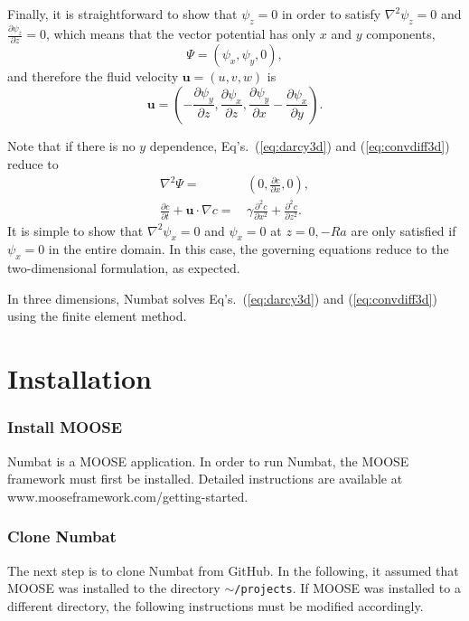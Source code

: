 \documentclass[11pt, a4paper]{csiroreport2012}
\begin{document}
Finally, it is straightforward to show that $\psi_z = 0$ in order to satisfy $\nabla^2 \psi_z = 0$ and $\frac{\partial \psi_z}{\partial z} = 0$, which means that the vector potential has only $x$ and $y$ components, 
\begin{equation}
\Psi = (\psi_x, \psi_y, 0),
\end{equation}
and therefore the fluid velocity $\mathbf{u} = (u, v, w)$ is
\begin{equation}
\mathbf{u} = \left( -\frac{\partial \psi_y}{\partial z}, \frac{\partial \psi_x}{\partial z}, \frac{\partial \psi_y}{\partial x} - \frac{\partial \psi_x}{\partial y} \right).
\end{equation}

Note that if there is no $y$ dependence, Eq's.~(\ref{eq:darcy3d}) and (\ref{eq:convdiff3d}) reduce to 
\begin{align}
\nabla^2 \Psi = \, & \left(0, \frac{\partial c}{\partial x}, 0 \right), \\
\frac{\partial c}{\partial t} + \mathbf{u} \cdot \nabla c = \, & \gamma \frac{\partial^2 c}{\partial x^2}  + \frac{\partial^2 c}{\partial z^2}.
\end{align}
It is simple to show that $\nabla^2 \psi_x = 0$ and $\psi_x = 0$ at $z = 0, -Ra$ are only satisfied if $\psi_x = 0$ in the entire domain. In this case, the governing equations reduce to the two-dimensional formulation, as expected.

In three dimensions, Numbat solves Eq's.~(\ref{eq:darcy3d}) and (\ref{eq:convdiff3d}) using the finite element method.

\section{Installation}



\subsubsection*{Install MOOSE}
 Numbat is  a MOOSE application. In order to run Numbat, the MOOSE framework must first be installed. Detailed instructions are available at www.mooseframework.com/getting-started.
 
 \subsubsection*{Clone Numbat}
 
 The next step is to clone Numbat from GitHub. In the following, it assumed that MOOSE was installed to the directory \texttt{$\sim$/projects}. If MOOSE was installed to a different directory, the following instructions must be modified accordingly.
\end{document}
